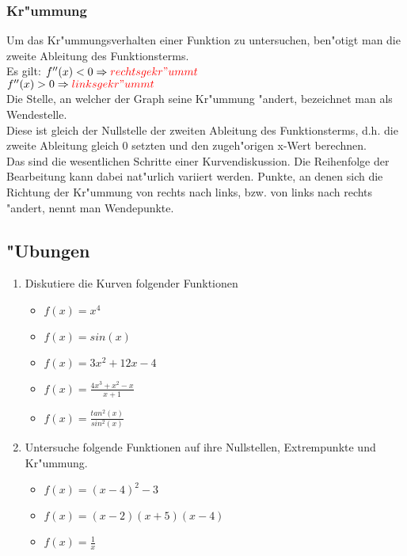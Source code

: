   \subsubsection{Kr"ummung}
 Um das Kr"ummungsverhalten einer Funktion zu untersuchen, ben"otigt man die zweite Ableitung des Funktionsterms.\\
 Es gilt: $f''(x)<0 \Rightarrow \textcolor{red}{rechtsgekr"ummt}$\\
 \hspace{1.4 cm}$f''(x)>0 \Rightarrow \textcolor{red}{linksgekr"ummt}$\\
 Die Stelle, an welcher der Graph seine Kr"ummung "andert, bezeichnet man als Wendestelle.\\
 Diese ist gleich der Nullstelle der zweiten Ableitung des Funktionsterms, d.h. die zweite Ableitung gleich 0 setzten und den zugeh"origen x-Wert berechnen.\vspace{0.5 cm}\\
 Das sind die wesentlichen Schritte einer Kurvendiskussion. Die Reihenfolge der Bearbeitung kann dabei nat"urlich variiert werden. Punkte, an denen sich die Richtung der Kr"ummung von rechts nach links, bzw. von links nach rechts "andert, nennt man Wendepunkte.
 \subsection{"Ubungen}
 \begin{enumerate}
 \item Diskutiere die Kurven folgender Funktionen
 \begin{itemize}
 \item $f(x)=x^4$
 \item $f(x)=sin(x)$
 \item $f(x)=3x^2 + 12x - 4$
 \item $f(x)=\frac{4x^3 + x^2 - x}{x+1}$
 \item $f(x)=\frac{tan^2(x)}{sin^2(x)}$
 \end{itemize}
 \item Untersuche folgende Funktionen auf ihre Nullstellen, Extrempunkte und Kr"ummung.
 \begin{itemize}
 \item $f(x)=(x-4)^2-3$
 \item $f(x)=(x-2)(x+5)(x-4)$
 \item $f(x)=\frac{1}{x}$
 \end{itemize}
 \end{enumerate}
 
 